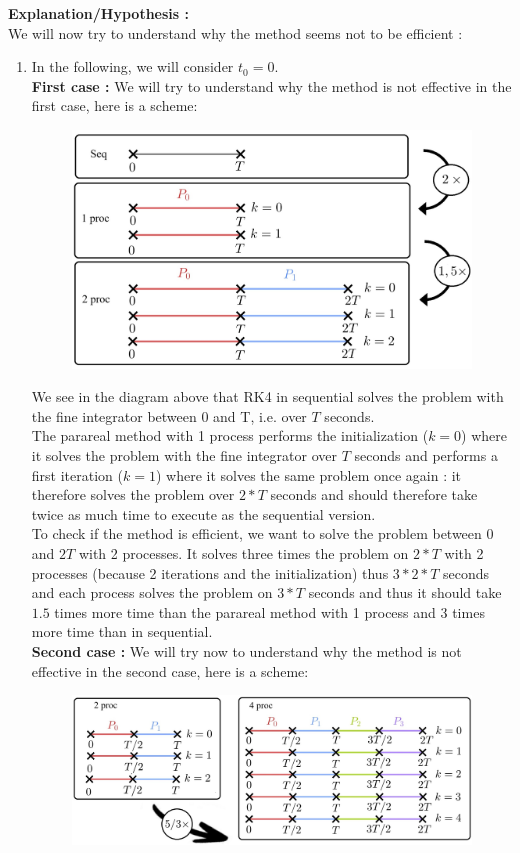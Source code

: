 \noindent \textbf{Explanation/Hypothesis :} \\
We will now try to understand why the method seems not to be efficient :
\begin{enumerate}[label=\textbullet]
	\item In the following, we will consider $t_0=0$. \\
	\textbf{First case :} We will try to understand why the method is not effective in the first case, here is a scheme: 
	\begin{figure}[H]      
		\centering
		\includegraphics[width=0.5\linewidth]{"images/parareal/cpp/efficient_1_vs_2.jpg"}
		\label{efficient_1_vs_2}
	\end{figure}
	We see in the diagram above that RK4 in sequential solves the problem with the fine integrator between 0 and T, i.e. over $T$ seconds. \\
	The parareal method with 1 process performs the initialization ($k=0$) where it solves the problem with the fine integrator over $T$ seconds and performs a first iteration ($k=1$) where it solves the same problem once again : it therefore solves the problem over $2*T$ seconds and should therefore take twice as much time to execute as the sequential version. \\
	To check if the method is efficient, we want to solve the problem between 0 and $2T$ with 2 processes.  It solves three times the problem on $2*T$ with 2 processes (because 2 iterations and the initialization) thus $3*2*T$ seconds and each process solves the problem on $3*T$ seconds and thus it should take $1.5$ times more time than the parareal method with 1 process and $3$ times more time than in sequential. \\
	\textbf{Second case :} We will try now to understand why the method is not effective in the second case, here is a scheme: 
	\begin{figure}[H]      
		\qquad \qquad \qquad
		\includegraphics[width=0.7\linewidth]{"images/parareal/cpp/efficient_2p_vs_4p.jpg"}

\end{figure}
\end{enumerate}
